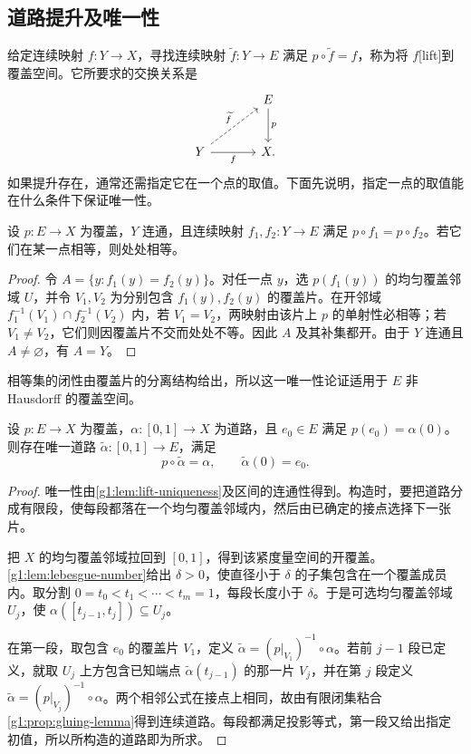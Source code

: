 \subsection{道路提升及唯一性}
\label{g1:subsec:0503:02}

给定连续映射 \(f:Y\to X\)，寻找连续映射 \(\widetilde f:Y\to E\) 满足 \(p\circ\widetilde f=f\)，称为将 \(f\)[lift]到覆盖空间。它所要求的交换关系是
\[
	\begin{tikzcd}[column sep=large,row sep=large]
		& E\arrow[d,"p"]\\
		Y\arrow[ur,dashed,"\widetilde f"]\arrow[r,"f"']&X.
	\end{tikzcd}
\]
如果提升存在，通常还需指定它在一个点的取值。下面先说明，指定一点的取值能在什么条件下保证唯一性。

\begin{lemma}\label{g1:lem:lift-uniqueness}
	设 \(p:E\to X\) 为覆盖，\(Y\) 连通，且连续映射 \(f_1,f_2:Y\to E\) 满足 \(p\circ f_1=p\circ f_2\)。若它们在某一点相等，则处处相等。
\end{lemma}
\begin{proof}
	令 \(A=\{y:f_1(y)=f_2(y)\}\)。对任一点 \(y\)，选 \(p(f_1(y))\) 的均匀覆盖邻域 \(U\)，并令 \(V_1,V_2\) 为分别包含 \(f_1(y),f_2(y)\) 的覆盖片。在开邻域 \(f_1^{-1}(V_1)\cap f_2^{-1}(V_2)\) 内，若 \(V_1=V_2\)，两映射由该片上 \(p\) 的单射性必相等；若 \(V_1\ne V_2\)，它们则因覆盖片不交而处处不等。因此 \(A\) 及其补集都开。由于 \(Y\) 连通且 \(A\ne\varnothing\)，有 \(A=Y\)。
\end{proof}

相等集的闭性由覆盖片的分离结构给出，所以这一唯一性论证适用于 \(E\) 非 Hausdorff 的覆盖空间。

\begin{theorem}\label{g1:thm:path-lifting}
	设 \(p:E\to X\) 为覆盖，\(\alpha:[0,1]\to X\) 为道路，且 \(e_0\in E\) 满足 \(p(e_0)=\alpha(0)\)。则存在唯一道路 \(\widetilde\alpha:[0,1]\to E\)，满足
	\[
		p\circ\widetilde\alpha=\alpha,\qquad \widetilde\alpha(0)=e_0.
	\]
\end{theorem}
\begin{proof}
	唯一性由\cref{g1:lem:lift-uniqueness}及区间的连通性得到。构造时，要把道路分成有限段，使每段都落在一个均匀覆盖邻域内，然后由已确定的接点选择下一张片。

	把 \(X\) 的均匀覆盖邻域拉回到 \([0,1]\)，得到该紧度量空间的开覆盖。\cref{g1:lem:lebesgue-number}给出 \(\delta>0\)，使直径小于 \(\delta\) 的子集包含在一个覆盖成员内。取分割 \(0=t_0<t_1<\cdots<t_m=1\)，每段长度小于 \(\delta\)。于是可选均匀覆盖邻域 \(U_j\)，使 \(\alpha([t_{j-1},t_j])\subseteq U_j\)。

	在第一段，取包含 \(e_0\) 的覆盖片 \(V_1\)，定义 \(\widetilde\alpha=(p|_{V_1})^{-1}\circ\alpha\)。若前 \(j-1\) 段已定义，就取 \(U_j\) 上方包含已知端点 \(\widetilde\alpha(t_{j-1})\) 的那一片 \(V_j\)，并在第 \(j\) 段定义 \(\widetilde\alpha=(p|_{V_j})^{-1}\circ\alpha\)。两个相邻公式在接点上相同，故由有限闭集粘合\cref{g1:prop:gluing-lemma}得到连续道路。每段都满足投影等式，第一段又给出指定初值，所以所构造的道路即为所求。
\end{proof}

